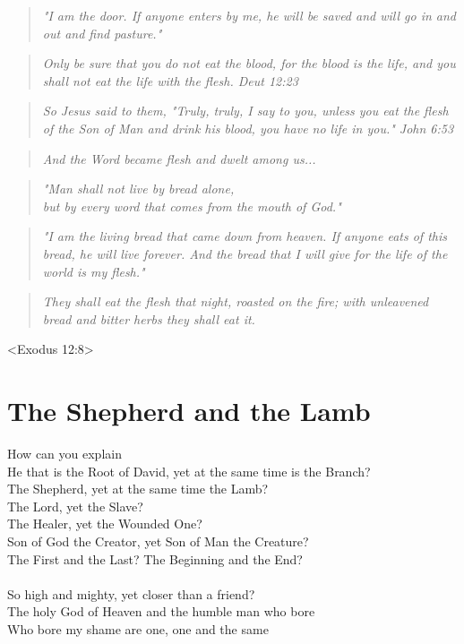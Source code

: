 \documentclass[10pt,oneside,footinclude=true,headinclude=true]{scrbook} %
\newcommand\quot[1]{
	\begin{quote}\textit{\small#1}\end{quote}
}
\begin{document}
\quot{"I am the door. If anyone enters by me, he will be saved and will go in and out and find pasture."}

\quot{Only be sure that you do not eat the blood, for the blood is the life, and you shall not eat the life with the flesh. Deut 12:23}

\quot{So Jesus said to them, "Truly, truly, I say to you, unless you eat the flesh of the Son of Man and drink his blood, you have no life in you." John 6:53}

\quot{And the Word became flesh and dwelt among us...}

\quot{"Man shall not live by bread alone,\\
\hspace*{5mm}but by every word that comes from the mouth of God."}

\quot{"I am the living bread that came down from heaven. If anyone eats of this bread, he will live forever. And the bread that I will give for the life of the world is my flesh."}

\quot{They shall eat the flesh that night, roasted on the fire; with unleavened bread and bitter herbs they shall eat it.}
<Exodus 12:8>


\chapter{The Shepherd and the Lamb}
How can you explain\\
He that is the Root of David, yet at the same time is the Branch?\\
The Shepherd, yet at the same time the Lamb?\\
The Lord, yet the Slave?\\
The Healer, yet the Wounded One?\\
Son of God the Creator, yet Son of Man the Creature?\\
The First and the Last? The Beginning and the End?\\
\\
So high and mighty, yet closer than a friend?\\
The holy God of Heaven and the humble man who bore\\
Who bore my shame are one, one and the same\\
\end{document}
